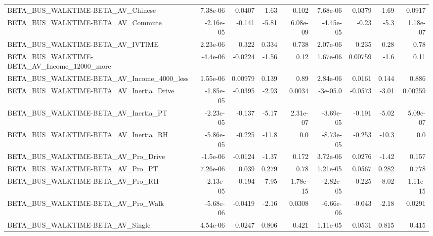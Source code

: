 \begin{tabular}{lrrrrrrrr}
BETA\_BUS\_WALKTIME-BETA\_AV\_Chinese                  &    7.38e-06 &       0.0407 &     1.63 &    0.102 &   7.68e-06 &      0.0379 &         1.69 &        0.0917 \\
BETA\_BUS\_WALKTIME-BETA\_AV\_Commute                  &   -2.16e-05 &       -0.141 &    -5.81 & 6.08e-09 &  -4.45e-05 &       -0.23 &         -5.3 &      1.18e-07 \\
BETA\_BUS\_WALKTIME-BETA\_AV\_IVTIME                   &    2.23e-06 &        0.322 &    0.334 &    0.738 &   2.07e-06 &       0.235 &         0.28 &          0.78 \\
BETA\_BUS\_WALKTIME-BETA\_AV\_Income\_12000\_more        &    -4.4e-06 &      -0.0224 &    -1.56 &     0.12 &   1.67e-06 &     0.00759 &         -1.6 &          0.11 \\
BETA\_BUS\_WALKTIME-BETA\_AV\_Income\_4000\_less         &    1.55e-06 &      0.00979 &    0.139 &     0.89 &   2.84e-06 &      0.0161 &        0.144 &         0.886 \\
BETA\_BUS\_WALKTIME-BETA\_AV\_Inertia\_Drive            &   -1.85e-05 &      -0.0395 &    -2.93 &   0.0034 &   -3e-05.0 &     -0.0573 &        -3.01 &       0.00259 \\
BETA\_BUS\_WALKTIME-BETA\_AV\_Inertia\_PT               &   -2.23e-05 &       -0.137 &    -5.17 & 2.31e-07 &  -3.69e-05 &      -0.191 &        -5.02 &      5.09e-07 \\
BETA\_BUS\_WALKTIME-BETA\_AV\_Inertia\_RH               &   -5.86e-05 &       -0.225 &    -11.8 &      0.0 &  -8.73e-05 &      -0.253 &        -10.3 &           0.0 \\
BETA\_BUS\_WALKTIME-BETA\_AV\_Pro\_Drive                &    -1.5e-06 &      -0.0124 &    -1.37 &    0.172 &   3.72e-06 &      0.0276 &        -1.42 &         0.157 \\
BETA\_BUS\_WALKTIME-BETA\_AV\_Pro\_PT                   &    7.26e-06 &        0.039 &    0.279 &     0.78 &   1.21e-05 &      0.0567 &        0.282 &         0.778 \\
BETA\_BUS\_WALKTIME-BETA\_AV\_Pro\_RH                   &   -2.13e-05 &       -0.194 &    -7.95 & 1.78e-15 &  -2.82e-05 &      -0.225 &        -8.02 &      1.11e-15 \\
BETA\_BUS\_WALKTIME-BETA\_AV\_Pro\_Walk                 &   -5.68e-06 &      -0.0419 &    -2.16 &   0.0308 &  -6.66e-06 &      -0.043 &        -2.18 &        0.0291 \\
BETA\_BUS\_WALKTIME-BETA\_AV\_Single                   &    4.54e-06 &       0.0247 &    0.806 &    0.421 &   1.11e-05 &      0.0531 &        0.815 &         0.415 \\

\end{tabular}
